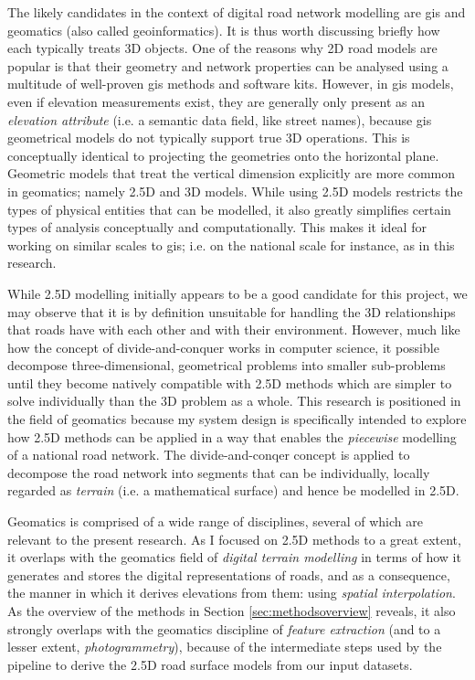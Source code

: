 The likely candidates in the context of digital road network modelling are \ac{gis} and geomatics (also called geoinformatics). It is thus worth discussing briefly how each typically treats 3D objects. One of the reasons why 2D road models are popular is that their geometry and network properties can be analysed using a multitude of well-proven \ac{gis} methods and software kits. However, in \ac{gis} models, even if elevation measurements exist, they are generally only present as an \textit{elevation attribute} (i.e. a semantic data field, like street names), because \ac{gis} geometrical models do not typically support true 3D operations. This is conceptually identical to projecting the geometries onto the horizontal plane. Geometric models that treat the vertical dimension explicitly are more common in geomatics; namely 2.5D and 3D models. While using 2.5D models restricts the types of physical entities that can be modelled, it also greatly simplifies certain types of analysis conceptually and computationally. This makes it ideal for working on similar scales to \ac{gis}; i.e. on the national scale for instance, as in this research.

While 2.5D modelling initially appears to be a good candidate for this project, we may observe that it is by definition unsuitable for handling the 3D relationships that roads have with each other and with their environment. However, much like how the concept of divide-and-conquer works in computer science, it possible decompose three-dimensional, geometrical problems into smaller sub-problems until they become natively compatible with 2.5D methods which are simpler to solve individually than the 3D problem as a whole. This research is positioned in the field of geomatics because my system design is specifically intended to explore how 2.5D methods can be applied in a way that enables the \textit{piecewise} modelling of a national road network. The divide-and-conqer concept is applied to decompose the road network into segments that can be individually, locally regarded as \textit{terrain} (i.e. a mathematical surface) and hence be modelled in 2.5D.

Geomatics is comprised of a wide range of disciplines, several of which are relevant to the present research. As I focused on 2.5D methods to a great extent, it overlaps with the geomatics field of \textit{digital terrain modelling} in terms of how it generates and stores the digital representations of roads, and as a consequence, the manner in which it derives elevations from them: using \textit{spatial interpolation}. As the overview of the methods in Section \ref{sec:methodsoverview} reveals, it also strongly overlaps with the geomatics discipline of \textit{feature extraction} (and to a lesser extent, \textit{photogrammetry}), because of the intermediate steps used by the pipeline to derive the 2.5D road surface models from our input datasets.

